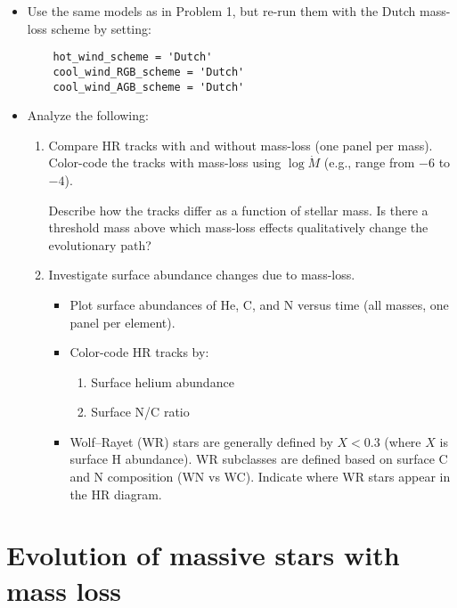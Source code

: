 \documentclass[11pt,a4paper]{article}
\begin{document}
\begin{itemize}[leftmargin=1.5em]
    \item Use the same models as in Problem 1, but re-run them with the Dutch mass-loss scheme by setting:
    
    \begin{lstlisting}
    hot_wind_scheme = 'Dutch'
    cool_wind_RGB_scheme = 'Dutch'
    cool_wind_AGB_scheme = 'Dutch'
    \end{lstlisting}

    \item Analyze the following:
    \begin{enumerate}[label=(\alph*)]
        \item Compare HR tracks with and without mass-loss (one panel per mass). Color-code the tracks with mass-loss using $\log \dot{M}$ (e.g., range from $-6$ to $-4$).
        
        Describe how the tracks differ as a function of stellar mass. Is there a threshold mass above which mass-loss effects qualitatively change the evolutionary path?

        \item Investigate surface abundance changes due to mass-loss. 
        \begin{itemize}
            \item Plot surface abundances of He, C, and N versus time (all masses, one panel per element).
            \item Color-code HR tracks by:
            \begin{enumerate}
                \item Surface helium abundance
                \item Surface N/C ratio
            \end{enumerate}
            \item Wolf–Rayet (WR) stars are generally defined by $X < 0.3$ (where $X$ is surface H abundance). WR subclasses are defined based on surface C and N composition (WN vs WC). Indicate where WR stars appear in the HR diagram.
        \end{itemize}
    \end{enumerate}
\end{itemize}




\section{Evolution of massive stars with mass loss}
\end{document}
